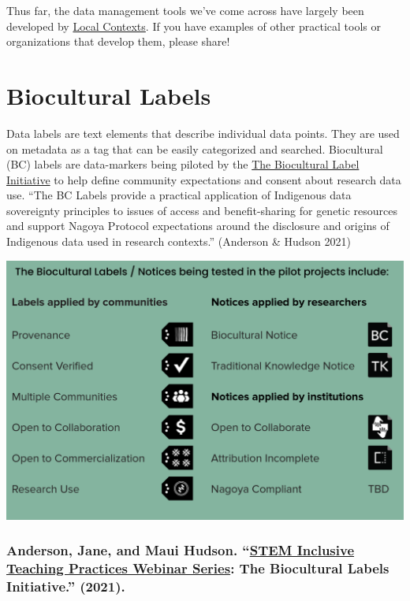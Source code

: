 \documentclass[
]{book}
\begin{document}
Thus far, the data management tools we've come across have largely been developed by \href{https://localcontexts.org/labels/biocultural-labels/}{Local Contexts}. If you have examples of other practical tools or organizations that develop them, please share!

\hypertarget{biocultural-labels}{%
\section{Biocultural Labels}\label{biocultural-labels}}

Data labels are text elements that describe individual data points. They are used on metadata as a tag that can be easily categorized and searched. Biocultural (BC) labels are data-markers being piloted by the \href{https://www.enrich-hub.org/bc-labels}{The Biocultural Label Initiative} to help define community expectations and consent about research data use. ``The BC Labels provide a practical application of Indigenous data sovereignty principles to issues of access and benefit-sharing for genetic resources and support Nagoya Protocol expectations around the disclosure and origins of Indigenous data used in research contexts.'' (Anderson \& Hudson 2021)

\includegraphics{images/biocultural_labels.png}

\hypertarget{anderson-jane-and-maui-hudson.-stem-inclusive-teaching-practices-webinar-series-the-biocultural-labels-initiative.-2021.}{%
\subsubsection*{\texorpdfstring{Anderson, Jane, and Maui Hudson. ``\href{https://qubeshub.org/publications/2326/1}{STEM Inclusive Teaching Practices Webinar Series}: The Biocultural Labels Initiative.'' (2021).}{Anderson, Jane, and Maui Hudson. ``STEM Inclusive Teaching Practices Webinar Series: The Biocultural Labels Initiative.'' (2021).}}\label{anderson-jane-and-maui-hudson.-stem-inclusive-teaching-practices-webinar-series-the-biocultural-labels-initiative.-2021.}}
\end{document}
